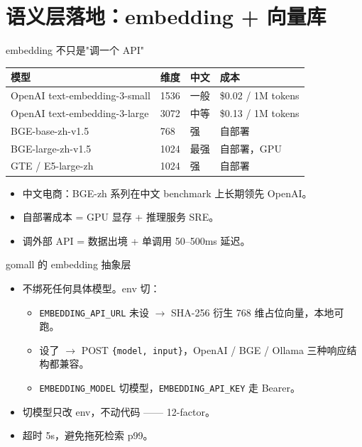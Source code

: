 \section{语义层落地：embedding + 向量库}

\begin{frame}{embedding 不只是"调一个 API"}
\begin{tabular}{@{}llll@{}}
\toprule
模型 & 维度 & 中文 & 成本 \\
\midrule
OpenAI text-embedding-3-small & 1536 & 一般  & \$0.02 / 1M tokens \\
OpenAI text-embedding-3-large & 3072 & 中等  & \$0.13 / 1M tokens \\
BGE-base-zh-v1.5               & 768  & 强   & 自部署 \\
BGE-large-zh-v1.5              & 1024 & 最强 & 自部署，GPU \\
GTE / E5-large-zh              & 1024 & 强   & 自部署 \\
\bottomrule
\end{tabular}
\vspace{2mm}
\begin{itemize}
  \item 中文电商：BGE-zh 系列在中文 benchmark 上长期领先 OpenAI。
  \item 自部署成本 = GPU 显存 + 推理服务 SRE。
  \item 调外部 API = 数据出境 + 单调用 50--500ms 延迟。
\end{itemize}
\end{frame}

\begin{frame}{gomall 的 embedding 抽象层}
\begin{itemize}
  \item 不绑死任何具体模型。env 切：
  \begin{itemize}
    \item \texttt{EMBEDDING\_API\_URL} 未设 $\to$ SHA-256 衍生 768 维占位向量，本地可跑。
    \item 设了 $\to$ POST \texttt{\{model, input\}}，OpenAI / BGE / Ollama 三种响应结构都兼容。
    \item \texttt{EMBEDDING\_MODEL} 切模型，\texttt{EMBEDDING\_API\_KEY} 走 Bearer。
  \end{itemize}
  \item 切模型只改 env，不动代码 —— 12-factor。
  \item 超时 5s，避免拖死检索 p99。
\end{itemize}
\vspace{2mm}
\end{frame}

